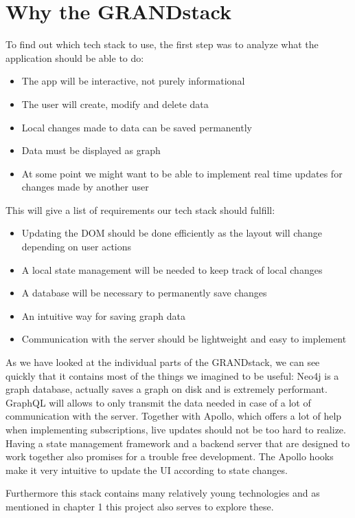 \section{Why the GRANDstack}
To find out which tech stack to use, the first step was to analyze what the application should be able to do:
\begin{itemize}
\item The app will be interactive, not purely informational
\item The user will create, modify and delete data
\item Local changes made to data can be saved permanently
\item Data must be displayed as graph
\item At some point we might want to be able to implement real time updates for changes made by another user
\end{itemize}
This will give a list of requirements our tech stack should fulfill:
\begin{itemize}
\item Updating the DOM should be done efficiently as the layout will change depending on user actions
\item A local state management will be needed to keep track of local changes
\item A database will be necessary to permanently save changes
\item An intuitive way for saving graph data
\item Communication with the server should be lightweight and easy to implement
\end{itemize}

As we have looked at the individual parts of the GRANDstack, we can see quickly that it contains most of the things we imagined to be useful: Neo4j is a graph database, actually saves a graph on disk and is extremely performant. GraphQL will allows to only transmit the data needed in case of a lot of communication with the server. Together with Apollo, which offers a lot of help when implementing subscriptions, live updates should not be too hard to realize. Having a state management framework and a backend server that are designed to work together also promises for a trouble free development. The Apollo hooks make it very intuitive to update the UI according to state changes.

Furthermore this stack contains many relatively young technologies and as mentioned in chapter 1 this project also serves to explore these.

